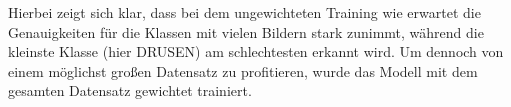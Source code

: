 \begin{figure}[h!]
  \hspace{8pt}
  \label{fig:eq_all}
\end{figure}
%
Hierbei zeigt sich klar, dass bei dem ungewichteten Training wie erwartet die
Genauigkeiten für die Klassen mit vielen Bildern stark zunimmt, während die
kleinste Klasse (hier DRUSEN) am schlechtesten erkannt wird. Um dennoch von
einem möglichst großen Datensatz zu profitieren, wurde das Modell mit dem
gesamten Datensatz gewichtet trainiert.
